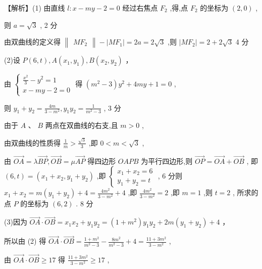 \documentclass[10pt]{article}
\begin{document}
【解析】(1) 由直线 \(l : x - {my} - 2 = 0\) 经过右焦点 \({F}_{2}\) ,得,点 \({F}_{2}\) 的坐标为 \(\left( {2,0}\right)\) ,

则 \(a = \sqrt{3}\) , 2 分

由双曲线的定义得 \(\begin{Vmatrix}{M{F}_{2}}\end{Vmatrix} - \left| {M{F}_{1}}\right|  = {2a} = 2\sqrt{3}\) ,则 \(\left| {M{F}_{2}}\right|  = 2 + 2\sqrt{3}\) 4 分

(2)设 \(P\left( {6,t}\right) ,A\left( {{x}_{1},{y}_{1}}\right) ,B\left( {{x}_{2},{y}_{2}}\right)\) ，

由 \(\left\{  \begin{array}{l} \frac{{x}^{2}}{3} - {y}^{2} = 1 \\  x - {my} - 2 = 0 \end{array}\right.\) 得 \(\left( {{m}^{2} - 3}\right) {y}^{2} + {4my} + 1 = 0\) ,

则 \({y}_{1} + {y}_{2} = \frac{4m}{3 - {m}^{2}},{y}_{1}{y}_{2} = \frac{1}{{m}^{2} - 3}\) , 3 分

由于 \(A\text{ 、 }B\) 两点在双曲线的右支,且 \(m > 0\) ,

由双曲线的性质得 \(\frac{1}{m} > \frac{\sqrt{3}}{3}\) ,即 \(0 < m < \sqrt{3}\) ,

由 \(\overrightarrow{OA} = \lambda \overrightarrow{BP},\overrightarrow{OB} = \mu \overrightarrow{AP}\) 得四边形 \({OAPB}\) 为平行四边形,则 \(\overrightarrow{OP} = \overrightarrow{OA} + \overrightarrow{OB}\) , 即 \(\left( {6,t}\right)  = \left( {{x}_{1} + {x}_{2},{y}_{1} + {y}_{2}}\right)\) ,即 \(\left\{  \begin{array}{l} {x}_{1} + {x}_{2} = 6 \\  {y}_{1} + {y}_{2} = t \end{array}\right.\) , 6 分则 \({x}_{1} + {x}_{2} = m\left( {{y}_{1} + {y}_{2}}\right)  + 4 = \frac{4{m}^{2}}{3 - {m}^{2}} + 4\) ,即 \(\frac{4{m}^{2}}{3 - {m}^{2}} = 2\) ,即 \(m = 1\) ,则 \(t = 2\) , 所求的点 \(P\) 的坐标为 \(\left( {6,2}\right)\) . 8 分

(3)因为 \(\overrightarrow{OA} \cdot  \overrightarrow{OB} = {x}_{1}{x}_{2} + {y}_{1}{y}_{2} = \left( {1 + {m}^{2}}\right) {y}_{1}{y}_{2} + {2m}\left( {{y}_{1} + {y}_{2}}\right)  + 4\) ，

所以由 (2) 得 \(\overrightarrow{OA} \cdot  \overrightarrow{OB} = \frac{1 + {m}^{2}}{{m}^{2} - 3} - \frac{8{m}^{2}}{{m}^{2} - 3} + 4 = \frac{{11} + 3{m}^{2}}{3 - {m}^{2}}\) ,

由 \(\overrightarrow{OA} \cdot  \overrightarrow{OB} \geq  {17}\) 得 \(\frac{{11} + 3{m}^{2}}{3 - {m}^{2}} \geq  {17}\) ,
\end{document}

